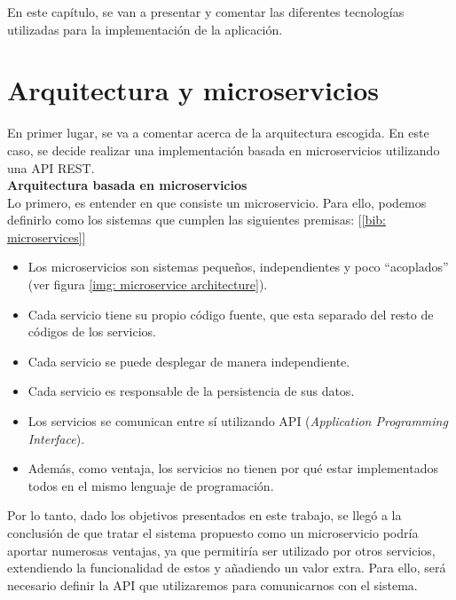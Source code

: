 \documentclass[a4paper, oneside, 12pt]{book}
\begin{document}
	\noindent En este capítulo, se van a presentar y comentar las diferentes tecnologías utilizadas para la implementación de la aplicación.
	
	\section{Arquitectura y microservicios}
	
	\noindent En primer lugar, se va a comentar acerca de la arquitectura escogida. En este caso, se decide realizar una implementación basada en microservicios utilizando una API REST. \\
	
	
	\noindent \textbf{\large Arquitectura basada en \textbf{microservicios}} \\
	
	\noindent Lo primero, es entender en que consiste un microservicio. Para ello, podemos definirlo como los sistemas que cumplen las siguientes premisas: [\ref{bib: microservices}]
	
	\begin{itemize}
		\item Los microservicios son sistemas pequeños, independientes y poco ``acoplados'' (ver figura \ref{img: microservice architecture}).
		
		\item Cada servicio tiene su propio código fuente, que esta separado del resto de códigos de los servicios.
		
		\item Cada servicio se puede desplegar de manera independiente. 
		
		\item Cada servicio es responsable de la persistencia de sus datos.
		
		\item Los servicios se comunican entre sí utilizando API (\textit{Application Programming Interface}).
		
		\item Además, como ventaja, los servicios no tienen por qué estar implementados todos en el mismo lenguaje de programación.
	\end{itemize}

	\noindent Por lo tanto, dado los objetivos presentados en este trabajo, se llegó a la conclusión de que tratar el sistema propuesto como un microservicio podría aportar numerosas ventajas, ya que permitiría ser utilizado por otros servicios, extendiendo la funcionalidad de estos y añadiendo un valor extra. Para ello, será necesario definir la API que utilizaremos para comunicarnos con el sistema.
	
\end{document}

